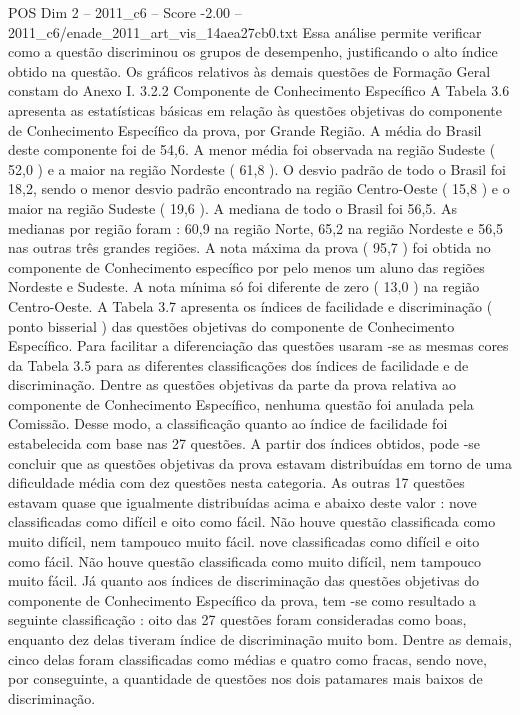 \begin{textsample}{POS Dim 2 – 2011\_c6 – Score -2.00 – 2011\_c6/enade\_2011\_art\_vis\_14aea27cb0.txt}
Essa análise permite verificar como a questão discriminou os grupos de desempenho, justificando o alto índice obtido na questão.
Os gráficos relativos às demais questões de Formação Geral constam do Anexo I. 3.2.2 Componente de Conhecimento Específico A Tabela 3.6 apresenta as estatísticas básicas em relação às questões objetivas do componente de Conhecimento Específico da prova, por Grande Região.
A média do Brasil deste componente foi de 54,6.
A menor média foi observada na região Sudeste ( 52,0 ) e a maior na região Nordeste ( 61,8 ).
O desvio padrão de todo o Brasil foi 18,2, sendo o menor desvio padrão encontrado na região Centro-Oeste ( 15,8 ) e o maior na região Sudeste ( 19,6 ).
A mediana de todo o Brasil foi 56,5.
As medianas por região foram : 60,9 na região Norte, 65,2 na região Nordeste e 56,5 nas outras três grandes regiões.
A nota máxima da prova ( 95,7 ) foi obtida no componente de Conhecimento específico por pelo menos um aluno das regiões Nordeste e Sudeste.
A nota mínima só foi diferente de zero ( 13,0 ) na região Centro-Oeste.
A Tabela 3.7 apresenta os índices de facilidade e discriminação ( ponto bisserial ) das questões objetivas do componente de Conhecimento Específico.
Para facilitar a diferenciação das questões usaram -se as mesmas cores da Tabela 3.5 para as diferentes classificações dos índices de facilidade e de discriminação.
Dentre as questões objetivas da parte da prova relativa ao componente de Conhecimento Específico, nenhuma questão foi anulada pela Comissão.
Desse modo, a classificação quanto ao índice de facilidade foi estabelecida com base nas 27 questões.
A partir dos índices obtidos, pode -se concluir que as questões objetivas da prova estavam distribuídas em torno de uma dificuldade média com dez questões nesta categoria.
As outras 17 questões estavam quase que igualmente distribuídas acima e abaixo deste valor : nove classificadas como difícil e oito como fácil.
Não houve questão classificada como muito difícil, nem tampouco muito fácil. nove classificadas como difícil e oito como fácil.
Não houve questão classificada como muito difícil, nem tampouco muito fácil.
Já quanto aos índices de discriminação das questões objetivas do componente de Conhecimento Específico da prova, tem -se como resultado a seguinte classificação : oito das 27 questões foram consideradas como boas, enquanto dez delas tiveram índice de discriminação muito bom.
Dentre as demais, cinco delas foram classificadas como médias e quatro como fracas, sendo nove, por conseguinte, a quantidade de questões nos dois patamares mais baixos de discriminação.

\end{textsample}
